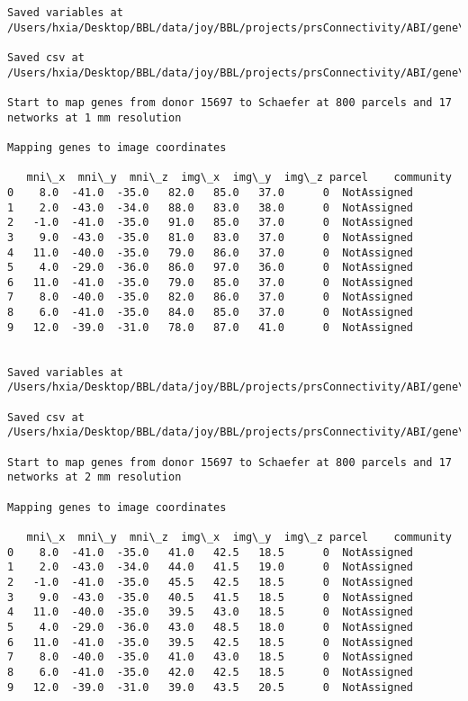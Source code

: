 \documentclass[11pt]{article}
\begin{document}
\begin{Verbatim}[commandchars=\\\{\}]
Saved variables at /Users/hxia/Desktop/BBL/data/joy/BBL/projects/prsConnectivity/ABI/gene\_mapping/15697donor\_800Parcels\_7Network\_2mm.pkl

Saved csv at /Users/hxia/Desktop/BBL/data/joy/BBL/projects/prsConnectivity/ABI/gene\_mapping/15697donor\_800Parcels\_7Network\_2mm.csv

Start to map genes from donor 15697 to Schaefer at 800 parcels and 17 networks at 1 mm resolution

Mapping genes to image coordinates

   mni\_x  mni\_y  mni\_z  img\_x  img\_y  img\_z parcel    community
0    8.0  -41.0  -35.0   82.0   85.0   37.0      0  NotAssigned
1    2.0  -43.0  -34.0   88.0   83.0   38.0      0  NotAssigned
2   -1.0  -41.0  -35.0   91.0   85.0   37.0      0  NotAssigned
3    9.0  -43.0  -35.0   81.0   83.0   37.0      0  NotAssigned
4   11.0  -40.0  -35.0   79.0   86.0   37.0      0  NotAssigned
5    4.0  -29.0  -36.0   86.0   97.0   36.0      0  NotAssigned
6   11.0  -41.0  -35.0   79.0   85.0   37.0      0  NotAssigned
7    8.0  -40.0  -35.0   82.0   86.0   37.0      0  NotAssigned
8    6.0  -41.0  -35.0   84.0   85.0   37.0      0  NotAssigned
9   12.0  -39.0  -31.0   78.0   87.0   41.0      0  NotAssigned


Saved variables at /Users/hxia/Desktop/BBL/data/joy/BBL/projects/prsConnectivity/ABI/gene\_mapping/15697donor\_800Parcels\_17Network\_1mm.pkl

Saved csv at /Users/hxia/Desktop/BBL/data/joy/BBL/projects/prsConnectivity/ABI/gene\_mapping/15697donor\_800Parcels\_17Network\_1mm.csv

Start to map genes from donor 15697 to Schaefer at 800 parcels and 17 networks at 2 mm resolution

Mapping genes to image coordinates

   mni\_x  mni\_y  mni\_z  img\_x  img\_y  img\_z parcel    community
0    8.0  -41.0  -35.0   41.0   42.5   18.5      0  NotAssigned
1    2.0  -43.0  -34.0   44.0   41.5   19.0      0  NotAssigned
2   -1.0  -41.0  -35.0   45.5   42.5   18.5      0  NotAssigned
3    9.0  -43.0  -35.0   40.5   41.5   18.5      0  NotAssigned
4   11.0  -40.0  -35.0   39.5   43.0   18.5      0  NotAssigned
5    4.0  -29.0  -36.0   43.0   48.5   18.0      0  NotAssigned
6   11.0  -41.0  -35.0   39.5   42.5   18.5      0  NotAssigned
7    8.0  -40.0  -35.0   41.0   43.0   18.5      0  NotAssigned
8    6.0  -41.0  -35.0   42.0   42.5   18.5      0  NotAssigned
9   12.0  -39.0  -31.0   39.0   43.5   20.5      0  NotAssigned



\end{Verbatim}
\end{document}

